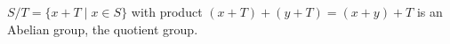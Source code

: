 $S/T = \{x + T \mid x \in S\}$ with product $(x+T)+(y+T)=(x+y)+T$ is an Abelian group, the quotient group.
